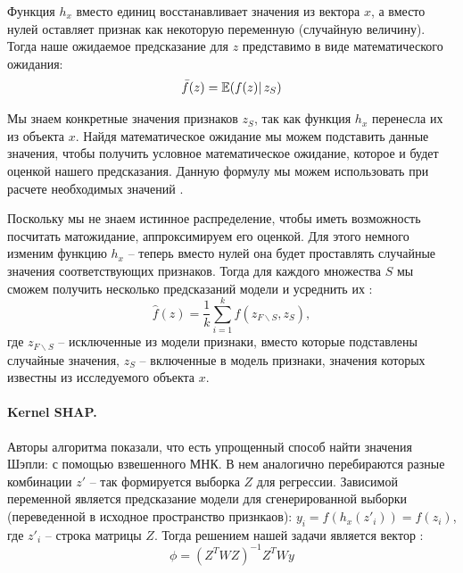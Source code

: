 Функция $h_x$ вместо единиц восстанавливает значения из вектора $x$, а вместо нулей оставляет признак как некоторую переменную (случайную величину).
Тогда наше ожидаемое предсказание для $z$ представимо в виде математического ожидания:
\[
\bar{f}(z) = \mathbb{E}(f(z)|\,z_S)
\]

Мы знаем конкретные значения признаков $z_S$, так как функция $h_x$ перенесла их из объекта $x$. Найдя математическое ожидание мы можем подставить данные значения, чтобы получить условное математическое ожидание, которое и будет оценкой нашего предсказания. Данную формулу мы можем использовать при расчете необходимых значений \cite{basis}.%

Поскольку мы не знаем истинное распределение, чтобы иметь возможность посчитать матожидание, аппроксимируем его оценкой. Для этого немного изменим функцию $h_x$ -- теперь вместо нулей она будет проставлять случайные значения соответствующих признаков. Тогда для каждого множества $S$ мы сможем получить несколько предсказаний модели и усреднить их \cite{basis}:
\[
\hat{f}(z) = \frac{1}{k} \sum\limits_{i=1}^k f(z_{F\backslash S}, z_S),
\]
где $z_{F\backslash S}$ -- исключенные из модели признаки, вместо которые подставлены случайные значения, $z_S$ -- включенные в модель признаки, значения которых известны из исследуемого объекта $x$.
\vspace{-2mm}

\paragraph{Kernel SHAP.}%
Авторы алгоритма показали, что есть упрощенный способ найти значения Шэпли: %
с помощью взвешенного МНК. В нем аналогично перебираются разные комбинации $z'$ -- так формируется выборка $Z$ для регрессии. Зависимой переменной является предсказание модели для сгенерированной выборки (переведенной в исходное пространство признкаов): $y_i = f(h_x(z'_i)) = f(z_i)$, где $z'_i$ -- строка матрицы $Z$. Тогда решением нашей задачи является вектор \cite{basis}: \[
\phi = (Z^T W Z)^{-1} Z^T W y
\]
\vspace{-6mm}

